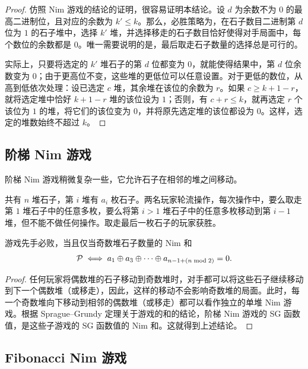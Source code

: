 \begin{proof}
	仿照 Nim 游戏的结论的证明，很容易证明本结论。设 $d$ 为余数不为 $0$ 的最高二进制位，且对应的余数为 $k'\le k$。那么，必胜策略为，在石子数目二进制第 $d$ 位为 $1$ 的石子堆中，选择 $k'$ 堆，并选择移走的石子数目恰好使得对手局面中，每个数位的余数都是 $0$。唯一需要说明的是，最后取走石子数量的选择总是可行的。
	
	实际上，只要将选定的 $k'$ 堆石子的第 $d$ 位都变为 $0$，就能使得结果中，第 $d$ 位余数变为 $0$；由于更高位不变，这些堆的更低位可以任意设置。对于更低的数位，从高到低依次处理：设已选定 $c$ 堆，其余堆在该位的余数为 $r$。如果 $c\ge k+1-r$，就将选定堆中恰好 $k+1-r$ 堆的该位设为 $1$；否则，有 $c+r\le k$，就再选定 $r$ 个该位为 $1$ 的堆，将它们的该位变为 $0$，并将原先选定堆的该位都设为 $0$。这样，选定的堆数始终不超过 $k$。
\end{proof}

\newpage

\subsection{阶梯 Nim 游戏}

阶梯 Nim 游戏稍微复杂一些，它允许石子在相邻的堆之间移动。

\begin{game}[阶梯 Nim]
	共有 $n$ 堆石子，第 $i$ 堆有 $a_i$ 枚石子。两名玩家轮流操作，每次操作中，要么取走第 $1$ 堆石子中的任意多枚，要么将第 $i>1$ 堆石子中的任意多枚移动到第 $i-1$ 堆，但不能不做任何操作。取走最后一枚石子的玩家获胜。
\end{game}

\begin{theorem}
	游戏先手必败，当且仅当奇数堆石子数量的 Nim 和
	$$\mathcal{P} \iff a_1\oplus a_3\oplus\cdots\oplus a_{n-1+(n\bmod 2)}=0.$$
\end{theorem}

\begin{proof}
	任何玩家将偶数堆的石子移动到奇数堆时，对手都可以将这些石子继续移动到下一个偶数堆（或移走），因此，这样的移动不会影响奇数堆的局面。此时，每一个奇数堆向下移动到相邻的偶数堆（或移走）都可以看作独立的单堆 Nim 游戏。根据 Sprague--Grundy 定理关于游戏的和的结论，阶梯 Nim 游戏的 SG 函数值，是这些子游戏的 SG 函数值的 Nim 和。这就得到上述结论。
\end{proof}

\subsection{Fibonacci Nim 游戏}


